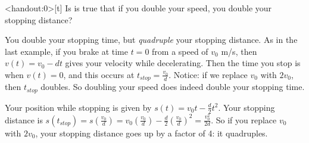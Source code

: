 \begin{frame}<handout:0>[t]
\textcolor{C1}{ Is is true that if you double your speed, you double your stopping distance?}

\color{answercolor}You double your stopping time, but \textit{quadruple} your stopping distance.
\vfill
As in the last example, if you brake at time $t=0$ from a speed of $v_0$ m/s, then $v(t)=v_0-dt$ gives your velocity while decelerating. Then the time you stop is when $v(t)=0$, and this occurs at $t_{stop}=\frac{v_0}{d}$.
\vfill
Notice: if we replace $v_0$ with $2v_0$, then $t_{stop}$ doubles. So doubling your speed does indeed double your stopping time.\vfill

Your position while stopping is given by $s(t)=v_0t-\frac{d}{2}t^2$. Your stopping distance is $s(t_{stop})=s\left( \frac{v_0}{d}\right)
=v_0\left( \frac{v_0}{d}\right)-\frac{d}{2}\left( \frac{v_0}{d}\right)^2 =\frac{v_0^2}{2d}$. So if you replace $v_0$ with $2v_0$, your stopping distance goes up by a factor of 4: it quadruples.\vfill
\end{frame}
